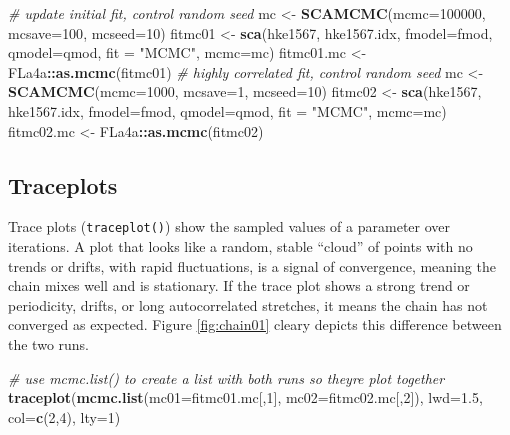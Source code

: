 \documentclass[
]{book}
\newenvironment{Shaded}{\begin{snugshade}}{\end{snugshade}}
\newcommand{\AttributeTok}[1]{\textcolor[rgb]{0.13,0.29,0.53}{#1}}
\newcommand{\CommentTok}[1]{\textcolor[rgb]{0.56,0.35,0.01}{\textit{#1}}}
\newcommand{\DecValTok}[1]{\textcolor[rgb]{0.00,0.00,0.81}{#1}}
\newcommand{\FloatTok}[1]{\textcolor[rgb]{0.00,0.00,0.81}{#1}}
\newcommand{\FunctionTok}[1]{\textcolor[rgb]{0.13,0.29,0.53}{\textbf{#1}}}
\newcommand{\NormalTok}[1]{#1}
\newcommand{\OtherTok}[1]{\textcolor[rgb]{0.56,0.35,0.01}{#1}}
\newcommand{\SpecialCharTok}[1]{\textcolor[rgb]{0.81,0.36,0.00}{\textbf{#1}}}
\newcommand{\StringTok}[1]{\textcolor[rgb]{0.31,0.60,0.02}{#1}}
\begin{document}
\begin{Shaded}
\begin{Highlighting}[]
\CommentTok{\# update initial fit, control random seed}
\NormalTok{mc }\OtherTok{\textless{}{-}} \FunctionTok{SCAMCMC}\NormalTok{(}\AttributeTok{mcmc=}\DecValTok{100000}\NormalTok{, }\AttributeTok{mcsave=}\DecValTok{100}\NormalTok{, }\AttributeTok{mcseed=}\DecValTok{10}\NormalTok{)}
\NormalTok{fitmc01 }\OtherTok{\textless{}{-}} \FunctionTok{sca}\NormalTok{(hke1567, hke1567.idx, }\AttributeTok{fmodel=}\NormalTok{fmod, }\AttributeTok{qmodel=}\NormalTok{qmod, }\AttributeTok{fit =} \StringTok{"MCMC"}\NormalTok{, }\AttributeTok{mcmc=}\NormalTok{mc)}
\NormalTok{fitmc01.mc }\OtherTok{\textless{}{-}}\NormalTok{ FLa4a}\SpecialCharTok{::}\FunctionTok{as.mcmc}\NormalTok{(fitmc01)}
\CommentTok{\# highly correlated fit, control random seed}
\NormalTok{mc }\OtherTok{\textless{}{-}} \FunctionTok{SCAMCMC}\NormalTok{(}\AttributeTok{mcmc=}\DecValTok{1000}\NormalTok{, }\AttributeTok{mcsave=}\DecValTok{1}\NormalTok{, }\AttributeTok{mcseed=}\DecValTok{10}\NormalTok{)}
\NormalTok{fitmc02 }\OtherTok{\textless{}{-}} \FunctionTok{sca}\NormalTok{(hke1567, hke1567.idx, }\AttributeTok{fmodel=}\NormalTok{fmod, }\AttributeTok{qmodel=}\NormalTok{qmod, }\AttributeTok{fit =} \StringTok{"MCMC"}\NormalTok{, }\AttributeTok{mcmc=}\NormalTok{mc)}
\NormalTok{fitmc02.mc }\OtherTok{\textless{}{-}}\NormalTok{ FLa4a}\SpecialCharTok{::}\FunctionTok{as.mcmc}\NormalTok{(fitmc02)}
\end{Highlighting}
\end{Shaded}

\hypertarget{traceplots}{%
\subsection{Traceplots}\label{traceplots}}

Trace plots (\texttt{traceplot()}) show the sampled values of a parameter over iterations. A plot that looks like a random, stable ``cloud'' of points with no trends or drifts, with rapid fluctuations, is a signal of convergence, meaning the chain mixes well and is stationary. If the trace plot shows a strong trend or periodicity, drifts, or long autocorrelated stretches, it means the chain has not converged as expected. Figure \ref{fig:chain01} cleary depicts this difference between the two runs.

\begin{Shaded}
\begin{Highlighting}[]
\CommentTok{\# use mcmc.list() to create a list with both runs so they\textquotesingle{}re plot together}
\FunctionTok{traceplot}\NormalTok{(}\FunctionTok{mcmc.list}\NormalTok{(}\AttributeTok{mc01=}\NormalTok{fitmc01.mc[,}\DecValTok{1}\NormalTok{], }\AttributeTok{mc02=}\NormalTok{fitmc02.mc[,}\DecValTok{2}\NormalTok{]), }\AttributeTok{lwd=}\FloatTok{1.5}\NormalTok{, }\AttributeTok{col=}\FunctionTok{c}\NormalTok{(}\DecValTok{2}\NormalTok{,}\DecValTok{4}\NormalTok{), }\AttributeTok{lty=}\DecValTok{1}\NormalTok{)}
\end{Highlighting}
\end{Shaded}
\end{document}
